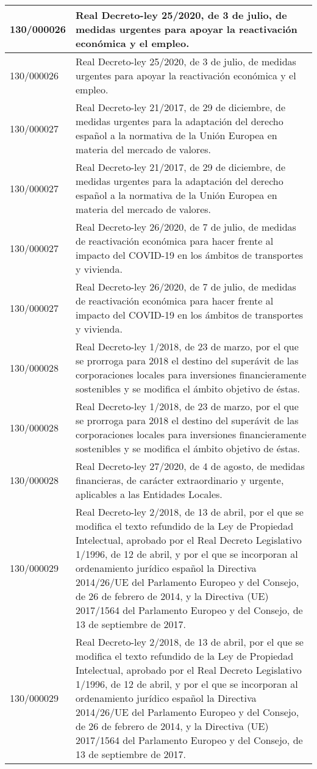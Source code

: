 {\begin{table}[H]
\begin{center}
\begin{tabularx}{\linewidth}{| l | X |}
\hline
130/000026 & Real Decreto-ley 25/2020, de 3 de julio, de medidas urgentes para apoyar la reactivación económica y el empleo. \\
\hline
130/000026 & Real Decreto-ley 25/2020, de 3 de julio, de medidas urgentes para apoyar la reactivación económica y el empleo. \\
\hline
130/000027 & Real Decreto-ley 21/2017, de 29 de diciembre, de medidas urgentes para la adaptación del derecho español a la normativa de la Unión Europea en materia del mercado de valores. \\
\hline
130/000027 & Real Decreto-ley 21/2017, de 29 de diciembre, de medidas urgentes para la adaptación del derecho español a la normativa de la Unión Europea en materia del mercado de valores. \\
\hline
130/000027 & Real Decreto-ley 26/2020, de 7 de julio, de medidas de reactivación económica para hacer frente al impacto del COVID-19 en los ámbitos de transportes y vivienda. \\
\hline
130/000027 & Real Decreto-ley 26/2020, de 7 de julio, de medidas de reactivación económica para hacer frente al impacto del COVID-19 en los ámbitos de transportes y vivienda. \\
\hline
130/000028 & Real Decreto-ley 1/2018, de 23 de marzo, por el que se prorroga para 2018 el destino del superávit de las corporaciones locales para inversiones financieramente sostenibles y se modifica el ámbito objetivo de éstas. \\
\hline
130/000028 & Real Decreto-ley 1/2018, de 23 de marzo, por el que se prorroga para 2018 el destino del superávit de las corporaciones locales para inversiones financieramente sostenibles y se modifica el ámbito objetivo de éstas. \\
\hline
130/000028 & Real Decreto-ley 27/2020, de 4 de agosto, de medidas financieras, de carácter extraordinario y urgente, aplicables a las Entidades Locales. \\
\hline
130/000029 & Real Decreto-ley 2/2018, de 13 de abril, por el que se modifica el texto refundido de la Ley de Propiedad Intelectual, aprobado por el Real Decreto Legislativo 1/1996, de 12 de abril, y por el que se incorporan al ordenamiento jurídico español la Directiva 2014/26/UE del Parlamento Europeo y del Consejo, de 26 de febrero de 2014, y la Directiva (UE) 2017/1564 del Parlamento Europeo y del Consejo, de 13 de septiembre de 2017. \\
\hline
130/000029 & Real Decreto-ley 2/2018, de 13 de abril, por el que se modifica el texto refundido de la Ley de Propiedad Intelectual, aprobado por el Real Decreto Legislativo 1/1996, de 12 de abril, y por el que se incorporan al ordenamiento jurídico español la Directiva 2014/26/UE del Parlamento Europeo y del Consejo, de 26 de febrero de 2014, y la Directiva (UE) 2017/1564 del Parlamento Europeo y del Consejo, de 13 de septiembre de 2017. \\

\end{tabularx}
\end{center}
\end{table}}
